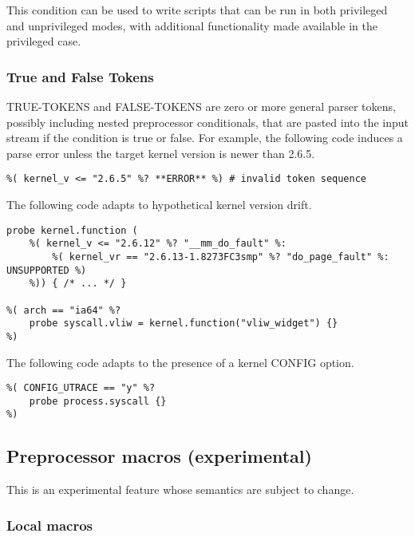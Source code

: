 \documentclass[twoside,english]{article}
\newenvironment{vindent}
{\begin{list}{}{\setlength{\listparindent}{6pt}}
\item[]}
{\end{list}}
\begin{document}
This condition can be used to write scripts that can be run in both
privileged and unprivileged modes, with additional functionality made
available in the privileged case.

\subsubsection{True and False Tokens}
TRUE-TOKENS and FALSE-TOKENS are zero or more general parser tokens, possibly
including nested preprocessor conditionals, that are pasted into the input
stream if the condition is true or false. For example, the following code
induces a parse error unless the target kernel version is newer than 2.6.5.

\begin{vindent}
\begin{verbatim}
%( kernel_v <= "2.6.5" %? **ERROR** %) # invalid token sequence
\end{verbatim}
\end{vindent}
The following code adapts to hypothetical kernel version drift.

\begin{vindent}
\begin{verbatim}
probe kernel.function (
    %( kernel_v <= "2.6.12" %? "__mm_do_fault" %:
        %( kernel_vr == "2.6.13-1.8273FC3smp" %? "do_page_fault" %: UNSUPPORTED %)
    %)) { /* ... */ }

%( arch == "ia64" %?
    probe syscall.vliw = kernel.function("vliw_widget") {}
%)

\end{verbatim}
\end{vindent}

The following code adapts to the presence of a kernel CONFIG option.

\begin{vindent}
\begin{verbatim}
%( CONFIG_UTRACE == "y" %?
    probe process.syscall {}
%)
\end{verbatim}
\end{vindent}


\subsection{Preprocessor macros (experimental)}

This is an experimental feature whose semantics are subject to change.

\subsubsection{Local macros}
\end{document}
